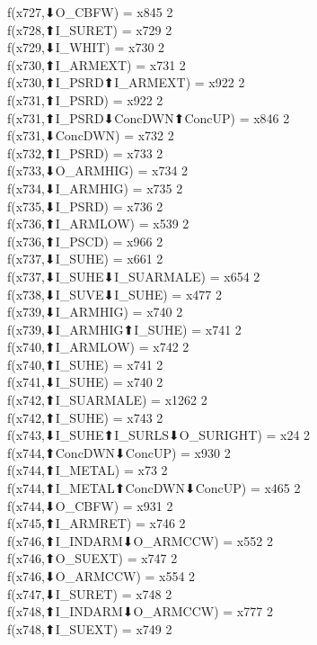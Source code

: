 f(x727,⬇O_CBFW) = x845 {2} \\
f(x728,⬆I_SURET) = x729 {2} \\
f(x729,⬇I_WHIT) = x730 {2} \\
f(x730,⬆I_ARMEXT) = x731 {2} \\
f(x730,⬆I_PSRD⬆I_ARMEXT) = x922 {2} \\
f(x731,⬆I_PSRD) = x922 {2} \\
f(x731,⬆I_PSRD⬇ConcDWN⬆ConcUP) = x846 {2} \\
f(x731,⬇ConcDWN) = x732 {2} \\
f(x732,⬆I_PSRD) = x733 {2} \\
f(x733,⬇O_ARMHIG) = x734 {2} \\
f(x734,⬇I_ARMHIG) = x735 {2} \\
f(x735,⬇I_PSRD) = x736 {2} \\
f(x736,⬆I_ARMLOW) = x539 {2} \\
f(x736,⬆I_PSCD) = x966 {2} \\
f(x737,⬇I_SUHE) = x661 {2} \\
f(x737,⬇I_SUHE⬇I_SUARMALE) = x654 {2} \\
f(x738,⬇I_SUVE⬇I_SUHE) = x477 {2} \\
f(x739,⬇I_ARMHIG) = x740 {2} \\
f(x739,⬇I_ARMHIG⬆I_SUHE) = x741 {2} \\
f(x740,⬆I_ARMLOW) = x742 {2} \\
f(x740,⬆I_SUHE) = x741 {2} \\
f(x741,⬇I_SUHE) = x740 {2} \\
f(x742,⬆I_SUARMALE) = x1262 {2} \\
f(x742,⬆I_SUHE) = x743 {2} \\
f(x743,⬇I_SUHE⬆I_SURLS⬇O_SURIGHT) = x24 {2} \\
f(x744,⬆ConcDWN⬇ConcUP) = x930 {2} \\
f(x744,⬆I_METAL) = x73 {2} \\
f(x744,⬆I_METAL⬆ConcDWN⬇ConcUP) = x465 {2} \\
f(x744,⬇O_CBFW) = x931 {2} \\
f(x745,⬆I_ARMRET) = x746 {2} \\
f(x746,⬆I_INDARM⬇O_ARMCCW) = x552 {2} \\
f(x746,⬆O_SUEXT) = x747 {2} \\
f(x746,⬇O_ARMCCW) = x554 {2} \\
f(x747,⬇I_SURET) = x748 {2} \\
f(x748,⬆I_INDARM⬇O_ARMCCW) = x777 {2} \\
f(x748,⬆I_SUEXT) = x749 {2} \\
